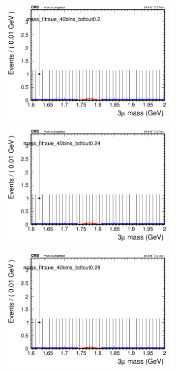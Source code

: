 \begin{figure}[H]
\begin{subfigure}{0.2\textwidth}
        \caption{}
    \end{subfigure}
    \begin{subfigure}{0.2\textwidth}
        \includegraphics[width=\textwidth]{flat_fit/plots/taue/massfit_taue_40bins_bdtcut0.2.png}
        \caption{}
    \end{subfigure}
    \begin{subfigure}{0.2\textwidth}
        \includegraphics[width=\textwidth]{flat_fit/plots/taue/massfit_taue_40bins_bdtcut0.24.png}
        \caption{}
    \end{subfigure}
    \begin{subfigure}{0.2\textwidth}
        \includegraphics[width=\textwidth]{flat_fit/plots/taue/massfit_taue_40bins_bdtcut0.28.png}

\end{subfigure}
\end{figure}

